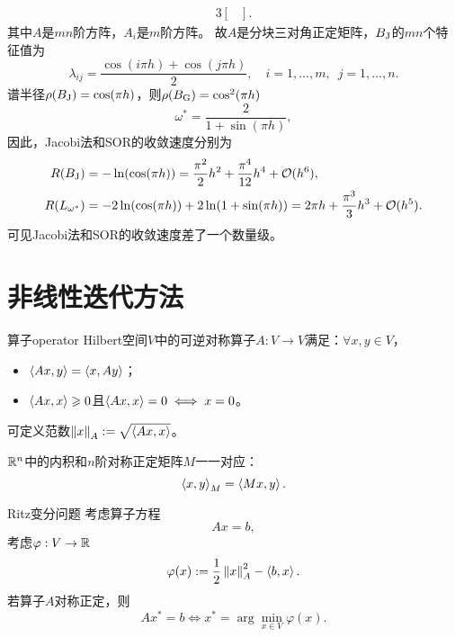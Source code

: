 \begin{example}
\begin{alignat*}{3}
\begin{bmatrix}
        \end{bmatrix}.
    \end{alignat*}
    其中$A$是$mn$阶方阵，$A_i$是$m$阶方阵。
    故$A$是分块三对角正定矩阵，$B_\text J$的$mn$个特征值为
    \[
        \lambda_{ij}=\frac{\cos(i\pi h)+\cos(j\pi h)}2,\quad i=1,\ldots,m,\enspace j=1,\ldots,n.
    \]
    谱半径$\rho(B_\text J)=\cos(\pi h)$，则$\rho(B_\text G)=\cos^2(\pi h)$
    \[
        \omega^*=\frac2{1+\sin(\pi h)},
    \]
    因此，Jacobi法和SOR的收敛速度分别为
    \begin{alignat*}{3}
        R(B_\text J)&=-\ln(\cos(\pi h))=\frac{\pi^2}2h^2+\frac{\pi^4}{12}h^4+\mathcal O(h^6),\\
        R(L_{\omega^*})&=-2\ln(\cos(\pi h))+2\ln(1+\sin(\pi h))=2\pi h+\frac{\pi^3}3h^3+\mathcal O(h^5).
    \end{alignat*}
    可见Jacobi法和SOR的收敛速度差了一个数量级。
\end{example}

\section{非线性迭代方法}


\begin{definition}
    {算子}{operator}
    Hilbert空间$V$中的可逆对称算子$A:V\to V$满足：$\forall x,y\in V$，
    \begin{itemize}
        \item $\left\langle Ax,y\right\rangle=\left\langle x,Ay\right\rangle$；
        \item $\left\langle Ax,x\right\rangle\geqslant 0$且$\left\langle Ax,x\right\rangle=0\iff x=0$。
    \end{itemize}
    可定义范数$\left\lVert x\right\rVert_A:=\sqrt{\left\langle Ax,x\right\rangle}$。
\end{definition}

\begin{example}
    {}{}
    $\mathbb R^n$中的内积和$n$阶对称正定矩阵$M$一一对应：
    \[
        \left\langle x,y\right\rangle_M=\left\langle Mx,y\right\rangle.
    \]
\end{example}

\begin{theorem}
    {Ritz变分问题}{}
    考虑算子方程
    \begin{equation}
        Ax=b,
    \end{equation}
    考虑$\varphi:V\to\mathbb R$
    \begin{equation}
        \varphi(x):=\frac12\left\lVert x\right\rVert_A^2-\left\langle b,x\right\rangle.
    \end{equation}
    若算子$A$对称正定，则
    \begin{equation}
        Ax^*=b\iff x^*=\arg\min_{x\in V}\varphi(x).
    \end{equation}
\end{theorem}

